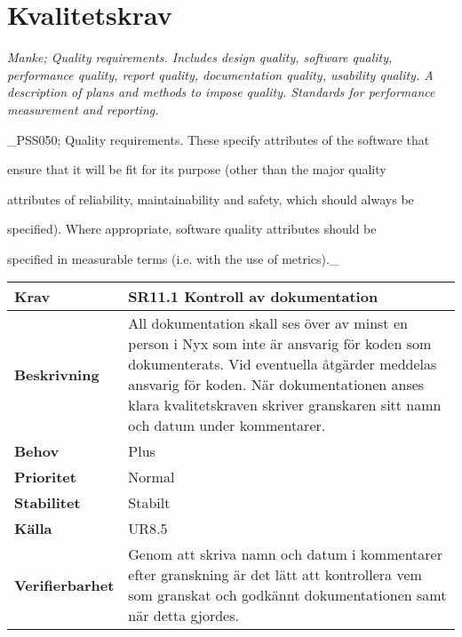 \documentclass[a4paper, twoside, 11pt, titlepage]{article}
\begin{document}
\clearpage
\section{Kvalitetskrav}


\emph{Manke; Quality requirements. Includes design quality, software quality, performance quality, report quality, documentation quality, usability quality. A description of plans and methods to impose quality. Standards for performance measurement and reporting.}

\_PSS050; Quality requirements. These specify attributes of the software that

ensure that it will be fit for its purpose (other than the major quality

attributes of reliability, maintainability and safety, which should always be

specified). Where appropriate, software quality attributes should be

specified in measurable terms (i.e. with the use of metrics).\_

\begin{tabular} { p{2.6cm} p{12.5cm} }
	\hline
	\sffamily\textbf{Krav} & \sffamily\textbf{SR11.1 Kontroll av dokumentation } \\
	\hline
	\sffamily\textbf{Beskrivning} &  All dokumentation skall ses över av minst en person i Nyx som inte är ansvarig för koden som dokumenterats. Vid eventuella åtgärder meddelas ansvarig för koden. När dokumentationen anses klara kvalitetskraven skriver granskaren sitt namn och datum under kommentarer.  \\
	\hline
	\sffamily\textbf{Behov} & Plus  \\
	\hline
	\sffamily\textbf{Prioritet} & Normal  \\
	\hline
	\sffamily\textbf{Stabilitet} & Stabilt  \\
	\hline
	\sffamily\textbf{Källa} &  UR8.5  \\
	\hline
	\sffamily\textbf{Verifierbarhet} &  Genom att skriva namn och datum i kommentarer efter granskning är det lätt att kontrollera vem som granskat och godkännt dokumentationen samt när detta gjordes.  \\
	\hline
\end{tabular}
\vspace{6mm}
\end{document}
